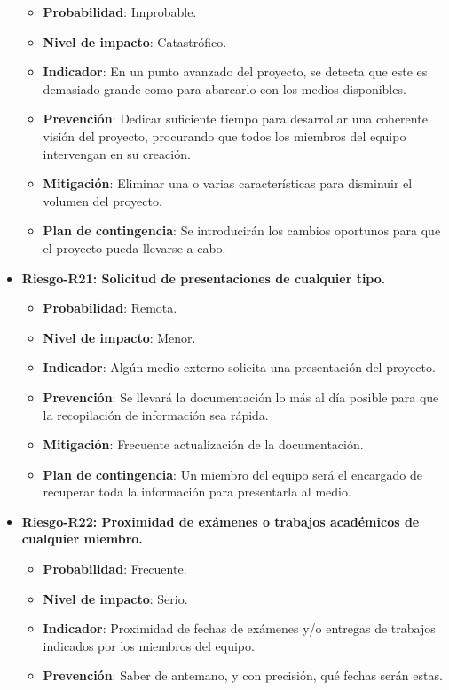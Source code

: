 \begin{itemize}
		\begin{itemize}	
		\item{ \bf Probabilidad}: Improbable.
		\item{ \bf Nivel de impacto}: Catastrófico.
		\item{ \bf Indicador}: En un punto avanzado del proyecto, se detecta que este es demasiado grande como para abarcarlo con los medios disponibles.
		\item{ \bf Prevención}: Dedicar suficiente tiempo para desarrollar una coherente visión del proyecto, procurando que todos los miembros del equipo intervengan en su creación.
		\item{ \bf Mitigación}: Eliminar una o varias características para disminuir el volumen del proyecto.
		\item{ \bf Plan de contingencia}: Se introducirán los cambios oportunos para que el proyecto pueda llevarse a cabo.\\
		\end{itemize}
\item { \bf Riesgo-R21: Solicitud de presentaciones de cualquier tipo.}
		\begin{itemize}	
		\item{ \bf Probabilidad}: Remota.
		\item{ \bf Nivel de impacto}: Menor.
		\item{ \bf Indicador}: Algún medio externo solicita una presentación del proyecto.
		\item{ \bf Prevención}: Se llevará la documentación lo más al día posible para que la recopilación de información sea rápida.
		\item{ \bf Mitigación}: Frecuente actualización de la documentación.
		\item{ \bf Plan de contingencia}: Un miembro del equipo será el encargado de recuperar toda la información para presentarla al medio.\\
		\end{itemize}
\item { \bf Riesgo-R22: Proximidad de exámenes o trabajos académicos de cualquier miembro.}
		\begin{itemize}	
		\item{ \bf Probabilidad}: Frecuente.
		\item{ \bf Nivel de impacto}: Serio.
		\item{ \bf Indicador}: Proximidad de fechas de exámenes y/o entregas de trabajos indicados por los miembros del equipo.
		\item{ \bf Prevención}: Saber de antemano, y con precisión, qué fechas serán estas.

\end{itemize}
\end{itemize}
